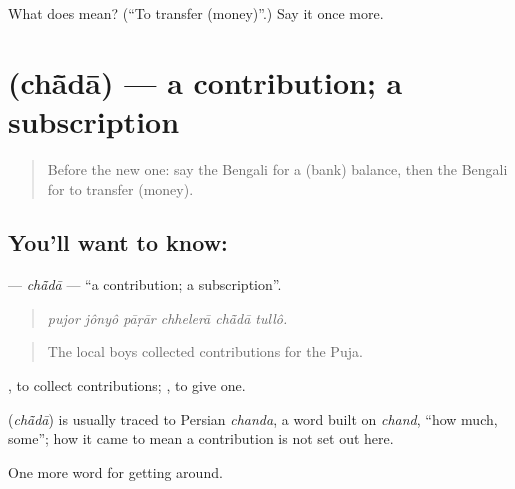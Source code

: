 \begin{tcolorbox}[breakable,colback=teal!4,colframe=teal!35!black,title={Before you move on}]
What does   mean? (\textquotedblleft{}To transfer (money)\textquotedblright{}.) Say it once more.
\end{tcolorbox}
\section[\texorpdfstring{\bn{চাঁদা} (chā̃dā)}{চাঁদা (chā̃dā)}]{ (chā̃dā) — a contribution; a subscription}

\label{lesson:BN-C417-chada}



\begin{quote}
Before the new one: say the Bengali for a (bank) balance, then the Bengali for to transfer (money).
\end{quote}

\subsection*{You'll want to know: }
\textbf{} — \emph{chā̃dā} — \textquotedblleft{}a contribution; a subscription\textquotedblright{}.

\begin{quote}
     
\end{quote}

\begin{quote}
\emph{pujor jônyô pāṛār chhelerā chā̃dā tullô.}
\end{quote}

\begin{quote}
The local boys collected contributions for the Puja.
\end{quote}

 , to collect contributions;  , to give one.

\begin{cousinweb}
\textbf{} (\emph{chā̃dā}) is usually traced to Persian \emph{chanda}, a word built on \emph{chand}, \textquotedblleft{}how much, some\textquotedblright{}; how it came to mean a contribution is not set out here.
\end{cousinweb}

\begin{grammarlens}[title={What you've built}]
One more word for getting around.
\end{grammarlens}

